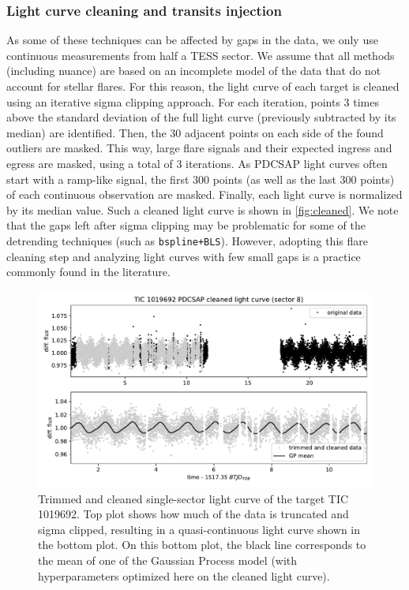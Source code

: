 \documentclass[modern]{aastex631}
\begin{document}
\subsubsection*{Light curve cleaning and transits injection}

As some of these techniques can be affected by gaps in the data, we only use continuous measurements from half a TESS sector. We assume that all methods (including nuance) are based on an incomplete model of the data that do not account for stellar flares. For this reason, the light curve of each target is cleaned using an iterative sigma clipping approach. For each iteration, points 3 times above the standard deviation of the full light curve (previously subtracted by its median) are identified. Then, the 30 adjacent points on each side of the found outliers are masked. This way, large flare signals and their expected ingress and egress are masked, using a total of 3 iterations. As PDCSAP light curves often start with a ramp-like signal, the first 300 points (as well as the last 300 points) of each continuous observation are masked. Finally, each light curve is normalized by its median value. Such a cleaned light curve is shown in \autoref{fig:cleaned}. We note that the gaps left after sigma clipping may be problematic for some of the detrending techniques (such as \texttt{bspline+BLS}). However, adopting this flare cleaning step and analyzing light curves with few small gaps is a practice commonly found in the literature.
\begin{figure}[H]
    \centering
    \includegraphics[width=\linewidth]{../workflows/tess_injection_recovery/figures/cleaned/1019692.pdf}
    \caption{Trimmed and cleaned single-sector light curve of the target TIC 1019692. Top plot shows how much of the data is truncated and sigma clipped, resulting in a quasi-continuous light curve shown in the bottom plot. On this bottom plot, the black line corresponds to the mean of one of the Gaussian Process model (with hyperparameters optimized here on the cleaned light curve).}
    \label{fig:cleaned}
\end{figure}
\end{document}
